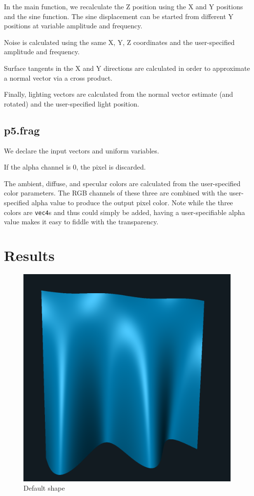 \documentclass[12pt,letterpaper]{article}
\begin{document}
In the main function, we recalculate the Z position using the X and Y positions
and the sine function. The sine displacement can be started from different
Y positions at variable amplitude and frequency.

Noise is calculated using the same X, Y, Z coordinates and the user-specified
amplitude and frequency.

Surface tangents in the X and Y directions are calculated in order to
approximate a normal vector via a cross product.

Finally, lighting vectors are calculated from the normal vector estimate (and
rotated) and the user-specified light position.

\subsection*{p5.frag}

We declare the input vectors and uniform variables.

If the alpha channel is 0, the pixel is discarded.

The ambient, diffuse, and specular colors are calculated from the
user-specified color parameters. The RGB channels of these three are combined
with the user-specified alpha value to produce the output pixel color. Note
while the three colors are {\tt vec4}s and thus could simply be added, having
a user-specifiable alpha value makes it easy to fiddle with the transparency.

\newpage
\section*{Results}

\begin{figure}[!h]
    \centering
    \includegraphics[width=1.0\textwidth]{img/plain.png}
    \caption{Default shape}
\end{figure}
\end{document}
